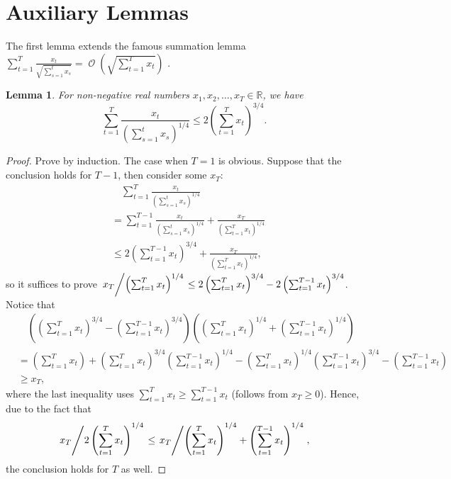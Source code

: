 \documentclass[11pt,fullpage,letterpaper]{article} %
\newtheorem{lemma}[theorem]{Lemma}
\renewcommand{\O}{\operatorname{\mathcal O}}
\begin{document}
\section{Auxiliary Lemmas}
The first lemma extends the famous summation lemma $\sum_{t=1}^T \frac{x_t}{\sqrt{\sum_{s=1}^t x_s}}=\O\left (\sqrt{\sum_{t=1}^T x_t}\right )$ \citep{auer2002nonstochastic}.
\begin{lemma}\label{lem:3/4 summation lemma}
For non-negative real numbers $x_1,x_2,\ldots,x_T\in \mathbb R$, we have
\begin{equation*}
\sum_{t=1}^T \frac{x_t}{\left (\sum_{s=1}^t x_s\right )^{1/4}} \le 2 \left (\sum_{t=1}^T x_t\right )^{3/4}.
\end{equation*}
\end{lemma}
\begin{proof}
Prove by induction. The case when $T=1$ is obvious. Suppose that the conclusion holds for $T-1$, then consider some $x_T$:
\begin{align*}
&\quad \sum_{t=1}^T \frac{x_t}{\left (\sum_{s=1}^t x_s\right )^{1/4}}\\
&= \sum_{t=1}^{T-1} \frac{x_t}{\left (\sum_{s=1}^t x_s\right )^{1/4}} + \frac{x_T}{\left (\sum_{t=1}^T x_t\right )^{1/4}}\\
&\le 2 \left (\sum_{t=1}^{T-1} x_t\right )^{3/4} + \frac{x_T}{\left (\sum_{t=1}^T x_t\right )^{1/4}},
\end{align*}
so it suffices to prove $\left . x_T \middle / \left (\sum_{t=1}^T x_t\right )^{1/4}\right .\le 2 \left (\sum_{t=1}^T x_t\right )^{3/4} - 2 \left (\sum_{t=1}^{T-1} x_t\right )^{3/4}$. Notice that
\begin{align*}
&\quad \left (\left (\sum_{t=1}^T x_t\right )^{3/4} - \left (\sum_{t=1}^{T-1} x_t\right )^{3/4}\right )\left (\left (\sum_{t=1}^T x_t\right )^{1/4}+\left (\sum_{t=1}^{T-1} x_t\right )^{1/4}\right )\\
&=\left (\sum_{t=1}^T x_t \right ) + \left (\sum_{t=1}^T x_t \right )^{3/4} \left (\sum_{t=1}^{T-1} x_t \right )^{1/4} - \left (\sum_{t=1}^T x_t \right )^{1/4} \left (\sum_{t=1}^{T-1} x_t \right )^{3/4} - \left (\sum_{t=1}^{T-1} x_t \right ) \\
&\ge x_T,
\end{align*}
where the last inequality uses $\sum_{t=1}^T x_t\ge \sum_{t=1}^{T-1} x_t$ (follows from $x_T\ge 0$). Hence, due to the fact that
\begin{equation*}
\left . x_T \middle / 2 \left (\sum_{t=1}^T x_t\right )^{1/4}\right .\le \left . x_T \middle / \left (\sum_{t=1}^T x_t\right )^{1/4} + \left (\sum_{t=1}^{T-1} x_t\right )^{1/4}\right .,
\end{equation*}
the conclusion holds for $T$ as well.
\end{proof}
\end{document}
